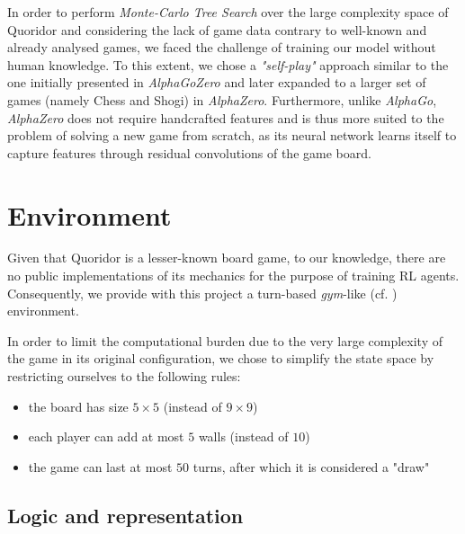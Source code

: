 \documentclass[journal, a4paper]{IEEEtran}
\begin{document}
In order to perform \textit{Monte-Carlo Tree Search} over the large complexity space of Quoridor and considering the lack of game data contrary to well-known and already analysed games, we faced the challenge of training our model without human knowledge.  To this extent, we chose a \textit{"self-play"} approach similar to the one initially presented in  \textit{AlphaGoZero}\cite{alphagozero} and later expanded to a larger set of games (namely Chess and Shogi) in \textit{AlphaZero}\cite{alphazero}. Furthermore, unlike \textit{AlphaGo}, \textit{AlphaZero} does not require handcrafted features and is thus more suited to the problem of solving a new game from scratch, as its neural network learns itself to capture features through residual convolutions of the game board. 

\section{Environment}
\label{sec:environment}

Given that Quoridor is a lesser-known board game, to our knowledge, there are no public implementations of its mechanics for the purpose of training RL agents. Consequently, we provide with this project a turn-based \textit{gym}-like (cf. \cite{openai-gym}) environment.

In order to limit the computational burden due to the very large complexity of the game in its original configuration, we chose to simplify the state space by restricting ourselves to the following rules:
\begin{itemize}
    \item the board has size $5\times 5$ (instead of $9\times 9$)
    \item each player can add at most $5$ walls (instead of $10$)
    \item the game can last at most $50$ turns, after which it is considered a "draw"
\end{itemize}

\subsection{Logic and representation}
\label{ssec:game-logic}
\end{document}
